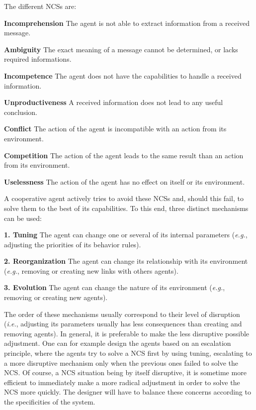 The different NCSs are:
\begin{compactitem}
\item\textbf{Incomprehension} The agent is not able to extract information from a received message.
\item\textbf{Ambiguity} The exact meaning of a message cannot be determined, or lacks required informations.
\item\textbf{Incompetence} The agent does not have the capabilities to handle a received information.
\item\textbf{Unproductiveness} A received information does not lead to any useful conclusion.
\item\textbf{Conflict} The action of the agent is incompatible with an action from its environment.
\item\textbf{Competition} The action of the agent leads to the same result than an action from its environment.
\item\textbf{Uselessness} The action of the agent has no effect on itself or its environment.
\end{compactitem}

A cooperative agent actively tries to avoid these NCSs and, should this fail, to solve them to the best of its capabilities. To this end, three distinct mechanisms can be used\cite{bonjean2009engineering}:

\begin{compactitem}
\item\textbf{1. Tuning} The agent can change one or several of its internal parameters (\textit{e.g.}, adjusting the priorities of its behavior rules).
\item\textbf{2. Reorganization} The agent can change its relationship with its environment (\textit{e.g.}, removing or creating new links with others agents).
\item\textbf{3. Evolution} The agent can change the nature of its environment (\textit{e.g.}, removing or creating new agents).
\end{compactitem}

The order of these mechanisms usually correspond to their level of disruption (\textit{i.e.}, adjusting its parameters usually has less consequences than creating and removing agents). In general, it is preferable to make the less disruptive possible adjustment. One can for example design the agents based on an escalation principle, where the agents try to solve a NCS first by using tuning, escalating to a more disruptive mechanism only when the previous ones failed to solve the NCS. Of course, a NCS situation being by itself disruptive, it is sometime more efficient to immediately make a more radical adjustment in order to solve the NCS more quickly. The designer will have to balance these concerns according to the specificities of the system.


